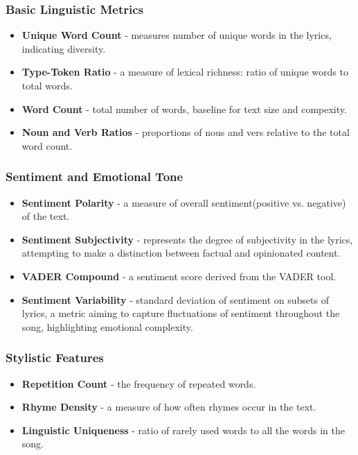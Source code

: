 \subsubsection*{Basic Linguistic Metrics}
\begin{itemize}
  \item \textbf{Unique Word Count} - measures number of unique words in the
    lyrics, indicating diversity.
  \item \textbf{Type-Token Ratio} - a measure of lexical richness: ratio of
    unique words to total words.
  \item \textbf{Word Count} - total  number of words, baseline for text size
    and compexity.
  \item \textbf{Noun and Verb Ratios} - proportions of nous and vers relative
    to the total word count.
\end{itemize}


\subsubsection*{Sentiment and Emotional Tone}
\begin{itemize}
  \item \textbf{Sentiment Polarity} - a measure of overall sentiment(positive
    vs. negative) of the text.
  \item \textbf{Sentiment Subjectivity} - represents the degree of subjectivity
    in the lyrics, attempting to make a distinction between factual and
    opinionated content.
  \item \textbf{VADER Compound} - a sentiment score derived from the VADER
    tool.
  \item \textbf{Sentiment Variability} - standard deviation of sentiment on
    subsets of lyrics, a metric  aiming to capture fluctuations of sentiment
    throughout the song, highlighting emotional complexity.
\end{itemize}


\subsubsection*{Stylistic Features}
\begin{itemize}
  \item \textbf{Repetition Count} - the frequency of repeated words.
  \item \textbf{Rhyme Density} - a measure of how often rhymes occur in the
    text.
  \item \textbf{Linguistic Uniqueness} - ratio of rarely used words to all the
    words in the song.
\end{itemize}


